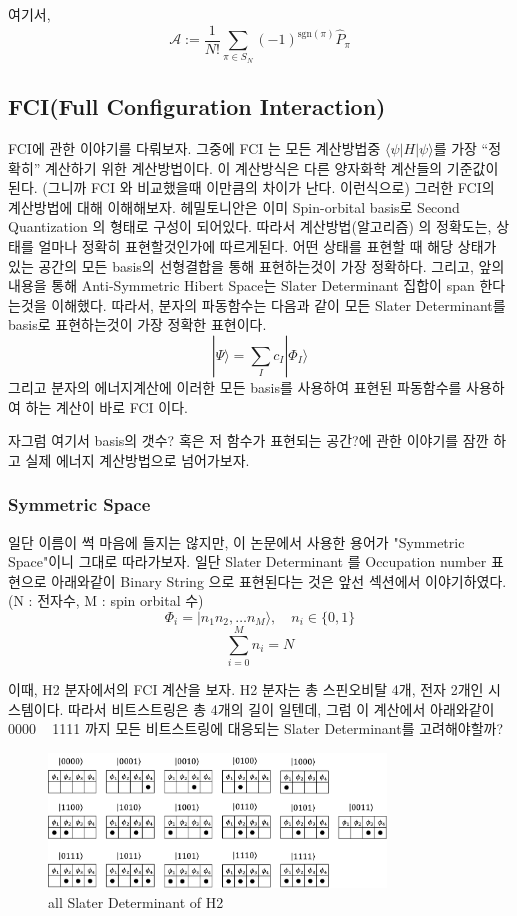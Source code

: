 \documentclass[10pt]{article}
\begin{document}
여기서, 
\[
\mathcal{A} := \frac{1}{N!} \sum_{\pi \in S_N} (-1)^{\text{sgn}(\pi)} \hat{P}_\pi
\]

\subsection{FCI(Full Configuration Interaction)}
FCI에 관한 이야기를 다뤄보자. 그중에 FCI 는 모든 계산방법중 \(\langle \psi|H|\psi \rangle\)를 가장  \enquote{정확히} 계산하기 위한 계산방법이다. 
이 계산방식은 다른 양자화학 계산들의 기준값이 된다. (그니까 FCI 와 비교했을때 이만큼의 차이가 난다. 이런식으로) 그러한 FCI의 계산방법에 대해 이해해보자. 
헤밀토니안은 이미 Spin-orbital basis로 Second Quantization 의 형태로 구성이 되어있다. 따라서 계산방법(알고리즘) 의 정확도는, 상태를 얼마나 정확히 표현할것인가에 따르게된다. 
어떤 상태를 표현할 때 해당 상태가 있는 공간의 모든 basis의 선형결합을 통해 표현하는것이 가장 정확하다. 
그리고, 앞의 내용을 통해 Anti-Symmetric Hibert Space는 Slater Determinant 집합이 span 한다는것을 이해했다. 
따라서, 분자의 파동함수는 다음과 같이 모든 Slater Determinant를 basis로 표현하는것이 가장 정확한 표현이다. 
\[
|\Psi\rangle = \sum_I c_I |\Phi_I\rangle
\]
그리고 분자의 에너지계산에 이러한 모든 basis를 사용하여 표현된 파동함수를 사용하여 하는 계산이 바로 FCI 이다. 

자그럼 여기서 basis의 갯수? 혹은 저 함수가 표현되는 공간?에 관한 이야기를 잠깐 하고 실제 에너지 계산방법으로 넘어가보자. 
\subsubsection{Symmetric Space}
일단 이름이 썩 마음에 들지는 않지만, 이 논문에서 사용한 용어가 "Symmetric Space"이니 그대로 따라가보자. 
일단 Slater Determinant 를 Occupation number 표현으로 아래와같이 Binary String 으로 표현된다는 것은 앞선 섹션에서 이야기하였다. (N : 전자수, M : spin orbital 수)
\[\Phi_i = \vert n_1n_2,\dots n_M \rangle ,\quad n_i \in \{0,1\}\]
\[\sum_{i=0}^{M}n_i = N\]

이때, H2 분자에서의 FCI 계산을 보자.
H2 분자는 총 스핀오비탈 4개, 전자 2개인 시스템이다. 
따라서 비트스트링은 총 4개의 길이 일텐데, 그럼 이 계산에서 아래와같이 0000 ~ 1111 까지 모든 비트스트링에 대응되는 Slater Determinant를 고려해야할까? 

\begin{figure}[htbp]
  \centering
  \includegraphics[width=0.8\textwidth]{fig/Cofig.png}
  \caption{all Slater Determinant of H2}
  \label{fig:example2}
\end{figure}
\end{document}
